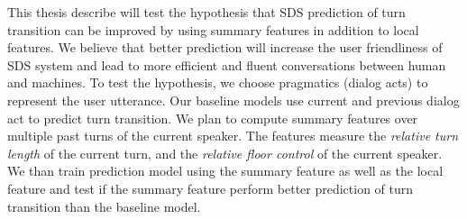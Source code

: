 This thesis describe will test the hypothesis that SDS prediction of turn transition can be improved by using summary features in addition to local features. We believe that better prediction will increase the user friendliness of SDS system and lead to more efficient and fluent conversations between human and machines. To test the hypothesis, we choose pragmatics (dialog acts) to represent the user utterance. Our baseline models use current and previous dialog act to predict turn transition. We plan to compute summary features over multiple past turns of the current speaker. The features measure the \textit{relative turn length} of the current turn, and the \textit{relative floor control} of the current speaker. We than train prediction model using the summary feature as well as the local feature and test if the summary feature perform better prediction of turn transition than the baseline model. 
